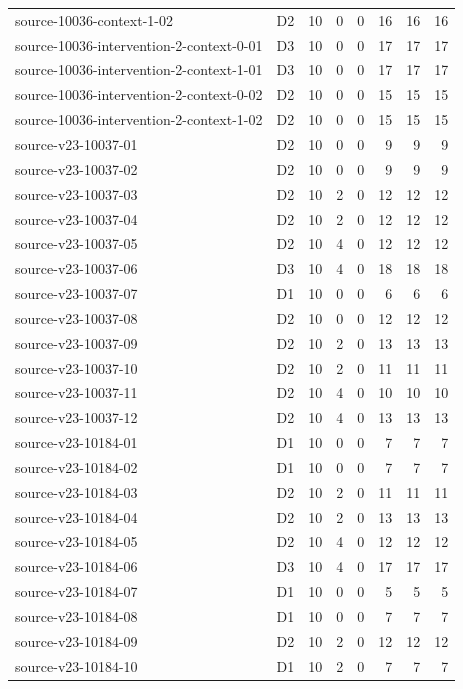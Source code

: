 \begin{longtable}{p{}lrrrrrr}
source-10036-context-1-02 & D2 & 10 & 0 & 0 & 16 & 16 & 16\\
source-10036-intervention-2-context-0-01 & D3 & 10 & 0 & 0 & 17 & 17 & 17\\
source-10036-intervention-2-context-1-01 & D3 & 10 & 0 & 0 & 17 & 17 & 17\\
source-10036-intervention-2-context-0-02 & D2 & 10 & 0 & 0 & 15 & 15 & 15\\
source-10036-intervention-2-context-1-02 & D2 & 10 & 0 & 0 & 15 & 15 & 15\\
source-v23-10037-01 & D2 & 10 & 0 & 0 & 9 & 9 & 9\\
source-v23-10037-02 & D2 & 10 & 0 & 0 & 9 & 9 & 9\\
source-v23-10037-03 & D2 & 10 & 2 & 0 & 12 & 12 & 12\\
source-v23-10037-04 & D2 & 10 & 2 & 0 & 12 & 12 & 12\\
source-v23-10037-05 & D2 & 10 & 4 & 0 & 12 & 12 & 12\\
source-v23-10037-06 & D3 & 10 & 4 & 0 & 18 & 18 & 18\\
source-v23-10037-07 & D1 & 10 & 0 & 0 & 6 & 6 & 6\\
source-v23-10037-08 & D2 & 10 & 0 & 0 & 12 & 12 & 12\\
source-v23-10037-09 & D2 & 10 & 2 & 0 & 13 & 13 & 13\\
source-v23-10037-10 & D2 & 10 & 2 & 0 & 11 & 11 & 11\\
source-v23-10037-11 & D2 & 10 & 4 & 0 & 10 & 10 & 10\\
source-v23-10037-12 & D2 & 10 & 4 & 0 & 13 & 13 & 13\\
source-v23-10184-01 & D1 & 10 & 0 & 0 & 7 & 7 & 7\\
source-v23-10184-02 & D1 & 10 & 0 & 0 & 7 & 7 & 7\\
source-v23-10184-03 & D2 & 10 & 2 & 0 & 11 & 11 & 11\\
source-v23-10184-04 & D2 & 10 & 2 & 0 & 13 & 13 & 13\\
source-v23-10184-05 & D2 & 10 & 4 & 0 & 12 & 12 & 12\\
source-v23-10184-06 & D3 & 10 & 4 & 0 & 17 & 17 & 17\\
source-v23-10184-07 & D1 & 10 & 0 & 0 & 5 & 5 & 5\\
source-v23-10184-08 & D1 & 10 & 0 & 0 & 7 & 7 & 7\\
source-v23-10184-09 & D2 & 10 & 2 & 0 & 12 & 12 & 12\\
source-v23-10184-10 & D1 & 10 & 2 & 0 & 7 & 7 & 7\\

\end{longtable}
